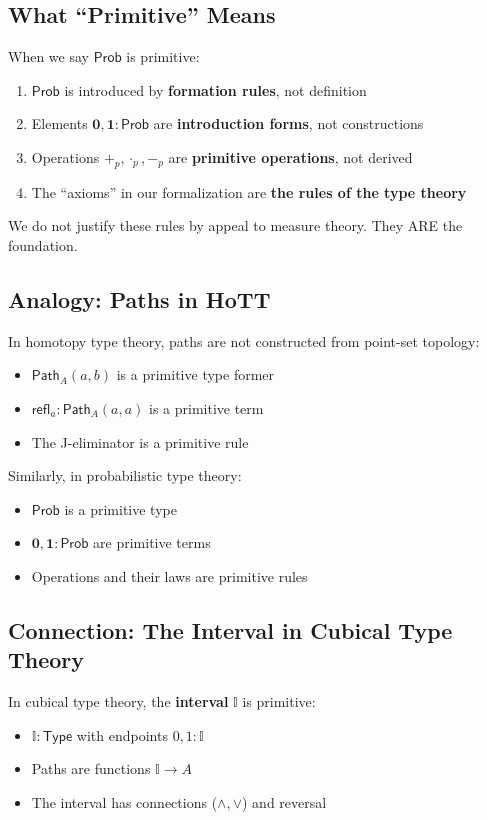\documentclass[11pt,a4paper]{article}
\newcommand{\Prob}{\mathsf{Prob}}
\newcommand{\Type}{\mathsf{Type}}
\newcommand{\pzero}{\mathbf{0}}
\newcommand{\pone}{\mathbf{1}}
\newcommand{\padd}{+_p}
\newcommand{\pmul}{\cdot_p}
\newcommand{\psub}{-_p}
\begin{document}
\subsection{What ``Primitive'' Means}

When we say $\Prob$ is primitive:

\begin{enumerate}
    \item $\Prob$ is introduced by \textbf{formation rules}, not definition
    \item Elements $\pzero, \pone : \Prob$ are \textbf{introduction forms}, not constructions
    \item Operations $\padd, \pmul, \psub$ are \textbf{primitive operations}, not derived
    \item The ``axioms'' in our formalization are \textbf{the rules of the type theory}
\end{enumerate}

We do not justify these rules by appeal to measure theory. They ARE the foundation.

\subsection{Analogy: Paths in HoTT}

In homotopy type theory, paths are not constructed from point-set topology:
\begin{itemize}
    \item $\mathsf{Path}_A(a,b)$ is a primitive type former
    \item $\mathsf{refl}_a : \mathsf{Path}_A(a,a)$ is a primitive term
    \item The J-eliminator is a primitive rule
\end{itemize}

Similarly, in probabilistic type theory:
\begin{itemize}
    \item $\Prob$ is a primitive type
    \item $\pzero, \pone : \Prob$ are primitive terms
    \item Operations and their laws are primitive rules
\end{itemize}

\subsection{Connection: The Interval in Cubical Type Theory}

In cubical type theory, the \textbf{interval} $\mathbb{I}$ is primitive:
\begin{itemize}
    \item $\mathbb{I} : \Type$ with endpoints $0, 1 : \mathbb{I}$
    \item Paths are functions $\mathbb{I} \to A$
    \item The interval has connections ($\land, \lor$) and reversal
\end{itemize}
\end{document}
